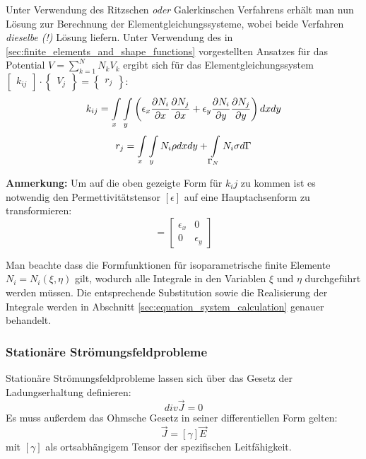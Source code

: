 Unter Verwendung des Ritzschen \textit{oder} Galerkinschen Verfahrens erhält man nun Lösung zur Berechnung der Elementgleichungssysteme, wobei beide Verfahren \textit{dieselbe (!)} Lösung liefern. Unter Verwendung des in \ref{sec:finite_elements_and_shape_functions} vorgestellten Ansatzes für das Potential $V = \sum_{k = 1}^{N} N_k V_k$ ergibt sich für das Elementgleichungssystem $\begin{bmatrix}k_{ij}\end{bmatrix} \cdot \begin{Bmatrix}V_j\end{Bmatrix} = \begin{Bmatrix}r_j\end{Bmatrix}$:
\begin{equation}
k_{ij} = \int\displaylimits_{x} \int\displaylimits_{y} \left(\epsilon_x \frac{\partial N_i}{\partial x}\frac{\partial N_j}{\partial x} +  \epsilon_y\frac{\partial N_i}{\partial y}\frac{\partial N_j}{\partial y}\right)dx dy
\end{equation}
\begin{equation}
	r_j = \int\displaylimits_{x} \int\displaylimits_{y} N_i \rho dx dy + \int\displaylimits_{\Gamma_N} N_i\sigma d\Gamma
\end{equation}

\textbf{Anmerkung:} Um auf die oben gezeigte Form für $k_ij$ zu kommen ist es notwendig den Permettivitätstensor $[\epsilon]$ auf eine Hauptachsenform zu transformieren:
\begin{equation*}
	[\epsilon] = \begin{bmatrix}
	\epsilon_x & 0 \\
	0 & \epsilon_y
	\end{bmatrix}
\end{equation*}

Man beachte dass die Formfunktionen für isoparametrische finite Elemente $N_i = N_i(\xi, \eta)$ gilt, wodurch alle Integrale in den Variablen $\xi$ und $\eta$ durchgeführt werden müssen. Die entsprechende Substitution sowie die Realisierung der Integrale werden in Abschnitt \ref{sec:equation_system_calculation} genauer behandelt. 


\subsubsection{Stationäre Strömungsfeldprobleme}
Stationäre Strömungsfeldprobleme lassen sich über das Gesetz der Ladungserhaltung definieren:
\begin{equation}
	\mathit{div}\vec{J} = 0
\end{equation}
 Es muss außerdem das Ohmsche Gesetz in seiner differentiellen Form gelten:
 \begin{equation}
 	\vec{J} = [\gamma] \vec{E}
 \end{equation}
 mit $[\gamma]$ als ortsabhängigem Tensor der spezifischen Leitfähigkeit.\newline
 
